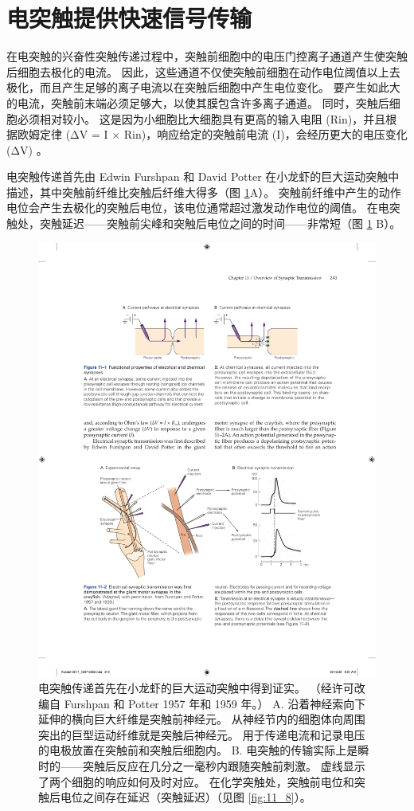 \section{电突触提供快速信号传输}
在电突触的兴奋性突触传递过程中，突触前细胞中的电压门控离子通道产生使突触后细胞去极化的电流。 
因此，这些通道不仅使突触前细胞在动作电位阈值以上去极化，而且产生足够的离子电流以在突触后细胞中产生电位变化。 
要产生如此大的电流，突触前末端必须足够大，以使其膜包含许多离子通道。 
同时，突触后细胞必须相对较小。 
这是因为小细胞比大细胞具有更高的输入电阻 (Rin)，并且根据欧姆定律 (ΔV = I × Rin)，响应给定的突触前电流 (I)，会经历更大的电压变化 (ΔV) 。


电突触传递首先由 Edwin Furshpan 和 David Potter 在小龙虾的巨大运动突触中描述，其中突触前纤维比突触后纤维大得多（图 \ref{fig:11_2}A）。 
突触前纤维中产生的动作电位会产生去极化的突触后电位，该电位通常超过激发动作电位的阈值。 
在电突触处，突触延迟——突触前尖峰和突触后电位之间的时间——非常短（图 \ref{fig:11_2} B）。

\begin{figure}[htbp]
	\centering
	\includegraphics[width=0.8\linewidth]{chap11/fig_11_2}
	\caption{电突触传递首先在小龙虾的巨大运动突触中得到证实。 （经许可改编自 Furshpan 和 Potter 1957 年和 1959 年。） A. 沿着神经索向下延伸的横向巨大纤维是突触前神经元。 从神经节内的细胞体向周围突出的巨型运动纤维就是突触后神经元。 用于传递电流和记录电压的电极放置在突触前和突触后细胞内。 B. 电突触的传输实际上是瞬时的——突触后反应在几分之一毫秒内跟随突触前刺激。 虚线显示了两个细胞的响应如何及时对应。 在化学突触处，突触前电位和突触后电位之间存在延迟（突触延迟）（见图 \ref{fig:11_8}）。}
	\label{fig:11_2}
\end{figure}


